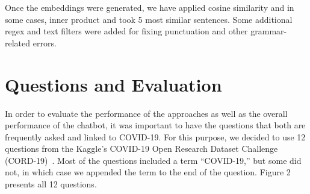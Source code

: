 \documentclass[sigconf,natbib=false]{acmart}
\begin{document}
\noindent Once the embeddings were generated, we have applied cosine similarity and in
some cases, inner product and took 5 most similar sentences. Some additional
regex and text filters were added for fixing punctuation and other grammar-related
errors.


\section{Questions and Evaluation}

In order to evaluate the performance of the approaches as well as the overall
performance of the chatbot, it was important to have the questions that both
are frequently asked and linked to COVID-19. For this purpose, we decided to
use 12 questions from the Kaggle's COVID-19 Open Research Dataset Challenge
(CORD-19)~\cite{kaggle}. Most of the questions included a term ``COVID-19,''
but some did not, in which case we appended the term to the end of the
question. Figure 2 presents all 12 questions.

\newpage %
\end{document}
